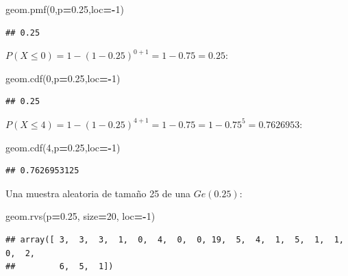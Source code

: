 \documentclass[]{book}
\newenvironment{Shaded}{\begin{snugshade}}{\end{snugshade}}
\newcommand{\DecValTok}[1]{\textcolor[rgb]{0.00,0.00,0.81}{#1}}
\newcommand{\FloatTok}[1]{\textcolor[rgb]{0.00,0.00,0.81}{#1}}
\newcommand{\NormalTok}[1]{#1}
\newcommand{\OperatorTok}[1]{\textcolor[rgb]{0.81,0.36,0.00}{\textbf{#1}}}
\begin{document}
\begin{Shaded}
\begin{Highlighting}[]
\NormalTok{geom.pmf(}\DecValTok{0}\NormalTok{,p}\OperatorTok{=}\FloatTok{0.25}\NormalTok{,loc}\OperatorTok{=-}\DecValTok{1}\NormalTok{)}
\end{Highlighting}
\end{Shaded}

\begin{verbatim}
## 0.25
\end{verbatim}

\(P(X\leq 0)=1- (1-0.25)^{0+1}=1-0.75=0.25\):

\begin{Shaded}
\begin{Highlighting}[]
\NormalTok{geom.cdf(}\DecValTok{0}\NormalTok{,p}\OperatorTok{=}\FloatTok{0.25}\NormalTok{,loc}\OperatorTok{=-}\DecValTok{1}\NormalTok{)}
\end{Highlighting}
\end{Shaded}

\begin{verbatim}
## 0.25
\end{verbatim}

\(P(X\leq 4)=1-(1-0.25)^{4+1}=1-0.75=1-0.75^5=0.7626953\):

\begin{Shaded}
\begin{Highlighting}[]
\NormalTok{geom.cdf(}\DecValTok{4}\NormalTok{,p}\OperatorTok{=}\FloatTok{0.25}\NormalTok{,loc}\OperatorTok{=-}\DecValTok{1}\NormalTok{)}
\end{Highlighting}
\end{Shaded}

\begin{verbatim}
## 0.7626953125
\end{verbatim}

Una muestra aleatoria de tamaño 25 de una \(Ge(0.25)\):

\begin{Shaded}
\begin{Highlighting}[]
\NormalTok{geom.rvs(p}\OperatorTok{=}\FloatTok{0.25}\NormalTok{, size}\OperatorTok{=}\DecValTok{20}\NormalTok{, loc}\OperatorTok{=-}\DecValTok{1}\NormalTok{)}
\end{Highlighting}
\end{Shaded}

\begin{verbatim}
## array([ 3,  3,  3,  1,  0,  4,  0,  0, 19,  5,  4,  1,  5,  1,  1,  0,  2,
##         6,  5,  1])
\end{verbatim}
\end{document}
